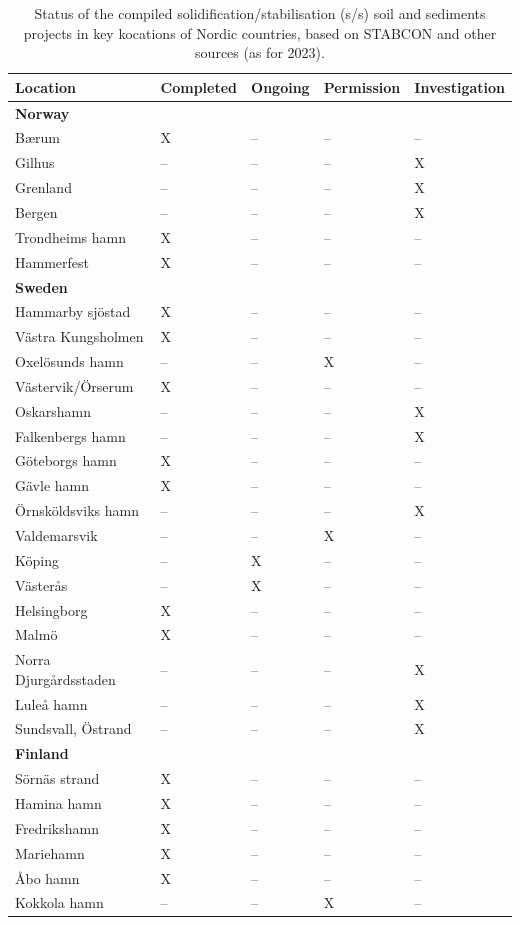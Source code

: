 \begin{table}[H] 
\caption{Status of the compiled solidification/stabilisation (s/s) soil and sediments projects in key kocations of Nordic countries, based on STABCON and other sources (as for 2023).\label{tab00}}
\begin{tabularx}{\textwidth}{lCCCC}
\toprule
\textbf{Location} & \textbf{Completed} & \textbf{Ongoing} & \textbf{Permission} & \textbf{Investigation} \\
\midrule
\bf{Norway} &  &  &  &  \\
\midrule
Bærum & X & -- & -- & -- \\
Gilhus & -- & -- & -- & X\\
Grenland	& -- & -- & -- & X\\
Bergen & -- & -- & -- & X\\
Trondheims hamn & X & -- & -- & -- \\
Hammerfest & X & -- & -- & -- \\
\midrule
\bf{Sweden} &  &  &  &  \\
 \midrule
Hammarby sjöstad & X & -- & -- & -- \\
Västra Kungsholmen & X & -- & -- & -- \\
Oxelösunds hamn & --  & -- & X & -- \\
Västervik/Örserum & X & -- & -- & -- \\
Oskarshamn & -- & -- & -- & X \\
Falkenbergs hamn  & -- & -- & -- & X \\
Göteborgs hamn & X & -- & -- & -- \\
Gävle hamn & X & -- & -- & -- \\
Örnsköldsviks hamn & -- & -- & -- & X \\
Valdemarsvik & -- & -- & X & -- \\
Köping & -- & X & -- & -- \\
Västerås & -- & X & -- & -- \\
Helsingborg & X & -- & -- & -- \\
Malmö & X & -- & -- & -- \\
Norra Djurgårdsstaden & -- & -- & -- & X \\
Luleå hamn & -- & -- & -- & X \\
Sundsvall, Östrand & -- & -- & -- & X \\
 \midrule
\bf{Finland}  &  &  &  &  \\
  \midrule
Sörnäs strand & X & -- & -- & -- \\
Hamina hamn & X & -- & -- & -- \\
Fredrikshamn & X & -- & -- & -- \\
Mariehamn & X & -- & -- & -- \\
Åbo hamn & X & -- & -- & -- \\
Kokkola hamn & -- & -- & X & -- \\
\bottomrule
\end{tabularx}
\end{table}